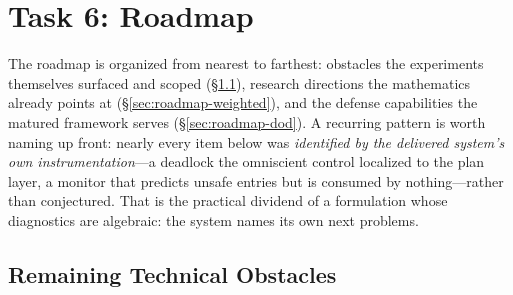 \documentclass[11pt]{article}
\newif\ifshowcomments
\theoremstyle{definition}
\theoremstyle{remark}
\newcommand{\prompt}[1]{%
    \ifshowcomments
        ~\todo[inline, color=techgold!80, textcolor=black,caption={Task}]{{\bf Prompt:} #1}%
    \fi
}
\newcommand{\ai}[1]{%
    \ifshowcomments
        \noindent\textcolor{techred}{[AI Agent]: #1}%
    \fi
}
\begin{document}
\ai{\textbf{Gap.} Subtask~5.3 remains the one Month~9 deliverable not met: the baseline is
specified and its harness slot exists, but no MARL code has been written, trained, or run.
Closing it is scoped in the roadmap (\S\ref{sec:roadmap-near}); the training budget and
schedule are deferred to discussion with the sponsor.}

\section{Task 6: Roadmap}
\label{sec:task6}

\prompt{Develop a written document that outlines the remaining technical obstacles, long-term
research paths, and future DoD applications of the SEAMAN project. This roadmap provides a
strategic plan for transitioning the research outcomes into practical defense capabilities.
Deliverable: Roadmap document, delivered with Milestone 5's Final Reports and Debrief.}

The roadmap is organized from nearest to farthest: obstacles the experiments themselves
surfaced and scoped (\S\ref{sec:roadmap-near}), research directions the mathematics already
points at (\S\ref{sec:roadmap-weighted}), and the defense capabilities the matured framework
serves (\S\ref{sec:roadmap-dod}).
A recurring pattern is worth naming up front: nearly every item below was \emph{identified by
the delivered system's own instrumentation}---a deadlock the omniscient control localized to
the plan layer, a monitor that predicts unsafe entries but is consumed by nothing---rather than
conjectured.
That is the practical dividend of a formulation whose diagnostics are algebraic: the system
names its own next problems.

\subsection{Remaining Technical Obstacles}
\label{sec:roadmap-near}
\end{document}
